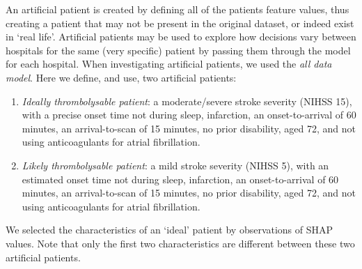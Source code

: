 An artificial patient is created by defining all of the patients feature values, thus creating a patient that may not be present in the original dataset, or indeed exist in `real life'. Artificial patients may be used to explore how decisions vary between hospitals for the same (very specific) patient by passing them through the model for each hospital. When investigating artificial patients, we used the \emph{all data model}. Here we define, and use, two artificial patients: 
\begin{enumerate}
    \item \emph{Ideally thrombolysable patient}: a moderate/severe stroke severity (NIHSS 15), with a precise onset time not during sleep, infarction, an onset-to-arrival of 60 minutes, an arrival-to-scan of 15 minutes, no prior disability, aged 72, and not using anticoagulants for atrial fibrillation.
    \item \emph{Likely thrombolysable patient}: a mild stroke severity (NIHSS 5), with an estimated onset time not during sleep, infarction, an onset-to-arrival of 60 minutes, an arrival-to-scan of 15 minutes, no prior disability, aged 72, and not using anticoagulants for atrial fibrillation. 
\end{enumerate}

We selected the characteristics of an `ideal' patient by observations of SHAP values. Note that only the first two characteristics are different between these two artificial patients.
\fi